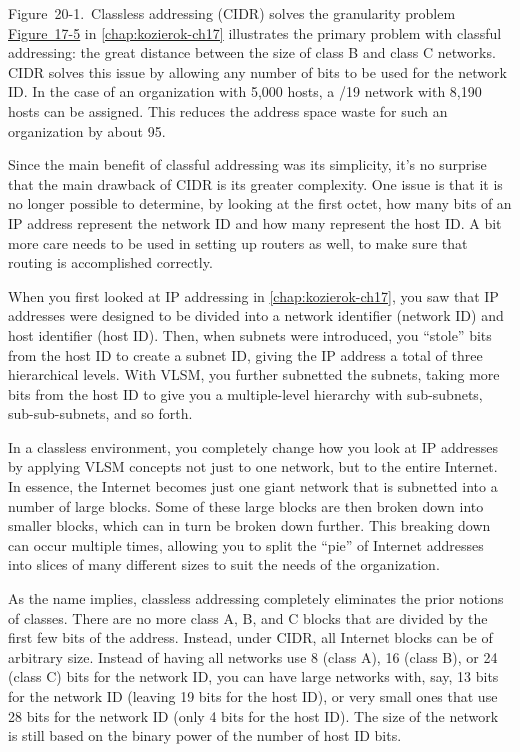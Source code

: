 Figure~20-1.~Classless addressing (CIDR) solves the granularity problem
\protect\hyperlink{ch17s07.htmlux5cux23the_main_problem_with_classful_addressin}{Figure~17-5}
in \vref{chap:kozierok-ch17} illustrates the primary
problem with classful addressing: the great distance between the size of
class B and class C networks. CIDR solves this issue by allowing any
number of bits to be used for the network ID. In the case of an
organization with 5,000 hosts, a /19 network with 8,190 hosts can be
assigned. This reduces the address space waste for such an organization
by about 95.

Since the main benefit of classful addressing was its simplicity, it's
no surprise that the main drawback of CIDR is its greater complexity.
One issue is that it is no longer possible to determine, by looking at
the first octet, how many bits of an IP address represent the network ID
and how many represent the host ID. A bit more care needs to be used in
setting up routers as well, to make sure that routing is accomplished
correctly.

\protect\hypertarget{ch20s02.html}{}{}

When you first looked at IP addressing in
\cref{chap:kozierok-ch17}, you saw that IP addresses
were designed to be divided into a network identifier (network ID) and
host identifier (host ID). Then, when subnets were introduced, you
``stole'' bits from the host ID to create a subnet ID, giving the IP
address a total of three
\protect\hypertarget{ch20s02.htmlux5cux23idx-CHP-20-0761}{}{}hierarchical
levels. With VLSM, you further subnetted the subnets, taking more bits
from the host ID to give you a multiple-level hierarchy with
sub-subnets, sub-sub-subnets, and so forth.

In a classless environment, you completely change how you look at IP
addresses by applying VLSM concepts not just to one network, but to the
entire Internet. In essence, the Internet becomes just one giant network
that is subnetted into a number of large blocks. Some of these large
blocks are then broken down into smaller blocks, which can in turn be
broken down further. This breaking down can occur multiple times,
allowing you to split the ``pie'' of Internet addresses into slices of
many different sizes to suit the needs of the organization.

As the name implies, classless addressing completely eliminates the
prior notions of classes. There are no more class A, B, and C blocks
that are divided by the first few bits of the address. Instead, under
\protect\hypertarget{ch20s02.htmlux5cux23idx-CHP-20-0762}{}{}CIDR, all
Internet blocks can be of arbitrary size. Instead of having all networks
use 8 (class A), 16 (class B), or 24 (class C) bits for the network ID,
you can have large networks with, say, 13 bits for the network ID
(leaving 19 bits for the host ID), or very small ones that use 28 bits
for the network ID (only 4 bits for the host ID). The size of the
network is still based on the binary power of the number of host ID
bits.


